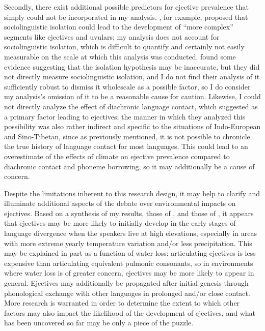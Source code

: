 \documentclass{article}
\begin{document}
Secondly, there exist additional possible predictors for ejective prevalence that simply could not be incorporated in my analysis. \textcite{nichols2014}, for example, proposed that sociolinguistic isolation could lead to the development of ``more complex'' segments like ejectives and uvulars; my analysis does not account for sociolinguistic isolation, which is difficult to quantify and certainly not easily measurable on the scale at which this analysis was conducted. \textcite{urban2021} found some evidence suggesting that the isolation hypothesis may be inaccurate, but they did not directly measure sociolinguistic isolation, and I do not find their analysis of it sufficiently robust to dismiss it wholescale as a possible factor, so I do consider my analysis's omission of it to be a reasonable cause for caution. Likewise, I could not directly analyze the effect of diachronic language contact, which \textcite{urban2021} suggested as a primary factor leading to ejectives; the manner in which they analyzed this possibility was also rather indirect and specific to the situations of Indo-European and Sino-Tibetan, since as previously mentioned, it is not possible to chronicle the true history of language contact for most languages. This could lead to an overestimate of the effects of climate on ejective prevalence compared to diachronic contact and phoneme borrowing, so it may additionally be a cause of concern. 

Despite the limitations inherent to this research design, it may help to clarify and illuminate additional aspects of the debate over environmental impacts on ejectives. Based on a synthesis of my results, those of \textcite{everett2013}, and those of \textcite{urban2021}, it appears that ejectives may be more likely to initially develop in the early stages of language divergence when the speakers live at high elevations, especially in areas with more extreme yearly temperature variation and/or less precipitation. This may be explained in part as a function of water loss: articulating ejectives is less expensive than articulating equivalent pulmonic consonants, so in environments where water loss is of greater concern, ejectives may be more likely to appear in general. Ejectives may additionally be propagated after initial genesis through phonological exchange with other languages in prolonged and/or close contact. More research is warranted in order to determine the extent to which other factors may also impact the likelihood of the development of ejectives, and what has been uncovered so far may be only a piece of the puzzle.
\end{document}

